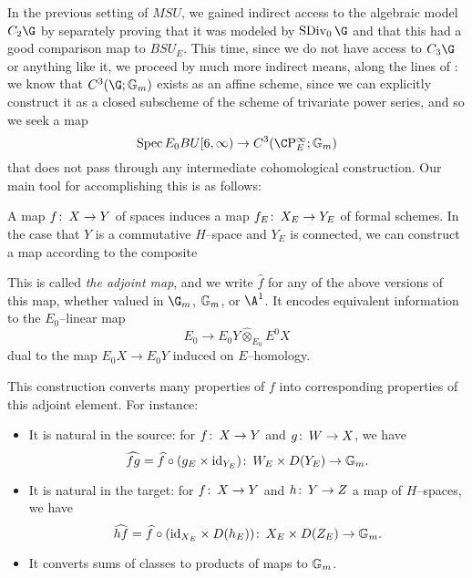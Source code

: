 In the previous setting of $MSU$, we gained indirect access to the algebraic model $C_2 \G$ by separately proving that it was modeled by $\SDiv_0 \G$ and that this had a good comparison map to $BSU_E$.  This time, since we do not have access to $C_3 \G$ or anything like it, we proceed by much more indirect means, along the lines of : we know that $C^3(\G; \Gm)$ exists as an affine scheme, since we can explicitly construct it as a closed subscheme of the scheme of trivariate power series, and so we seek a map \[\Spec E_0 BU[6, \infty) \to C^3(\CP^\infty_E; \Gm)\] that does not pass through any intermediate cohomological construction.  Our main tool for accomplishing this is as follows:
\begin{definition}
A map $f\colon\thinspace X \to Y$ of spaces induces a map $f_E \colon\thinspace X_E \to Y_E$ of formal schemes.  In the case that $Y$ is a commutative $H$--space and $Y_E$ is connected, we can construct a map according to the composite
\begin{center}
\end{center}
This is called \textit{the adjoint map}, and we write $\widehat f$ for any of the above versions of this map, whether valued in $\G_m$, $\mathbb G_m$, or $\A^1$.  It encodes equivalent information to the $E_0$--linear map \[E_0 \to E_0 Y \widehat\otimes_{E_0} E^0 X\] dual to the map $E_0 X \to E_0 Y$ induced on $E$--homology.
\end{definition}

\begin{remark}
This construction converts many properties of $f$ into corresponding properties of this adjoint element.  For instance:
\begin{itemize}
    \item It is natural in the source: for $f\colon\thinspace X \to Y$ and $g\colon\thinspace W \to X$, we have \[\widehat{fg} = \widehat{f} \circ (g_E \times \mathrm{id}_{Y_E})\colon\thinspace W_E \times D(Y_E) \to \mathbb G_m.\]
    \item It is natural in the target: for $f\colon\thinspace X \to Y$ and $h\colon\thinspace Y \to Z$ a map of $H$--spaces, we have \[\widehat{hf} = \widehat{f} \circ (\mathrm{id}_{X_E} \times D(h_E))\colon\thinspace X_E \times D(Z_E) \to \mathbb G_m.\]
    \item It converts sums of classes to products of maps to $\mathbb G_m$.
\end{itemize}
\end{remark}

